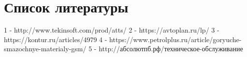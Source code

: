 \documentclass[./nirs.tex]{subfiles}
\begin{document}
\section*{Список литературы}
	1 - http://www.tekinsoft.com/prod/atts/
	2 - https://avtoplan.ru/lp/
	3 - https://kontur.ru/articles/4979
	4 - https://www.petrolplus.ru/article/goryuche-smazochnye-materialy-gsm/
	5 - http://абсолютпб.рф/техническое-обслуживание
\end{document}
